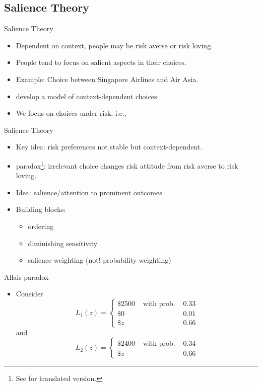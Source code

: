 \subsection{Salience Theory}


\begin{frame}{Salience Theory}
\begin{itemize}
\item Dependent on context, people may be risk averse or risk loving.\medskip
\item People tend to focus on salient aspects in their choices.\medskip
\item Example: Choice between Singapore Airlines and Air Asia.\medskip
\item \citet{BordaloGennaioliShleifer2012, BordaloGennaioliShleifer2013a, BordaloGennaioliShleifer2013b} develop a model of context-dependent choices.\medskip
\item We focus on choices under risk, i.e., \citet{BordaloGennaioliShleifer2012}
\end{itemize}
\end{frame}

\begin{frame}{Salience Theory}
    \begin{itemize}
        \item Key idea: risk preferences not stable but context-dependent.\medskip
        \item \citet{Allais1953} paradox\footnote{See \citet{Allais1979} for translated version.}: irrelevant choice changes risk attitude from risk averse to risk loving.\medskip
        \item Idea: salience/attention to prominent outcomes\medskip
        \item Building blocks:\smallskip
        \begin{itemize}
            \item ordering\medskip
            \item diminishing sensitivity\medskip
            \item salience weighting (\alert{not!} probability weighting)\medskip
        \end{itemize}
	\end{itemize}
\end{frame}

\begin{frame}[t]{Allais paradox}
\begin{itemize}
\item Consider\[L_1(z)=\left\{\begin{array}{lll}\$ 2500 & \text { with prob. } & 0.33\\ \$0 & & 0.01 \\ \$ z & & 0.66\end{array}\right.\]
and
\[L_2(z)=\left\{\begin{array}{lll}\$ 2400 & \text { with prob. } & 0.34 \\ \$ z & & 0.66\end{array}\right.\]\medskip
\end{itemize}
\end{frame}

